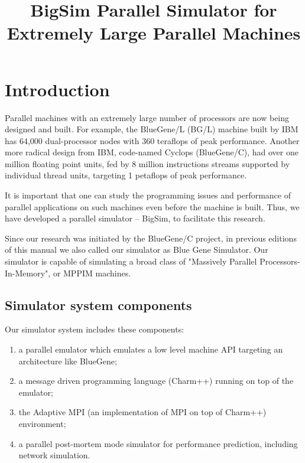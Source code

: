 \documentclass[10pt]{article}
\title{BigSim Parallel Simulator for Extremely Large Parallel Machines}
\begin{document}
\maketitle

\section{Introduction}


Parallel machines with an extremely large number of processors are now
being designed and built. For example, the BlueGene/L (BG/L) machine
built by IBM has 64,000 dual-processor nodes with 360 teraflops of
peak performance. Another more radical design from IBM,
code-named Cyclops (BlueGene/C), had over one million floating point units,
fed by 8 million instructions streams supported by individual thread units,
targeting 1 petaflops of peak performance.


It is important that one can study the programming issues and performance
of parallel applications on such machines even before the machine is built.
Thus, we have developed a parallel simulator -- BigSim, to facilitate this research.

Since our research was initiated by the BlueGene/C project, in previous
editions of this manual we also called our simulator as Blue Gene Simulator.
Our simulator is capable of simulating a broad class of "Massively Parallel
Processors-In-Memory", or MPPIM machines. 

\subsection{Simulator system components}

Our simulator system includes these components: 
\begin{enumerate}
\item a parallel emulator which emulates a low level machine API targeting an architecture like BlueGene; 
\item a message driven programming language (Charm++) running on top of the emulator; 
\item the Adaptive MPI (an implementation of MPI on top of Charm++) environment; 
\item a parallel post-mortem mode simulator for performance prediction, including network simulation. 
\end{enumerate}
\end{document}
